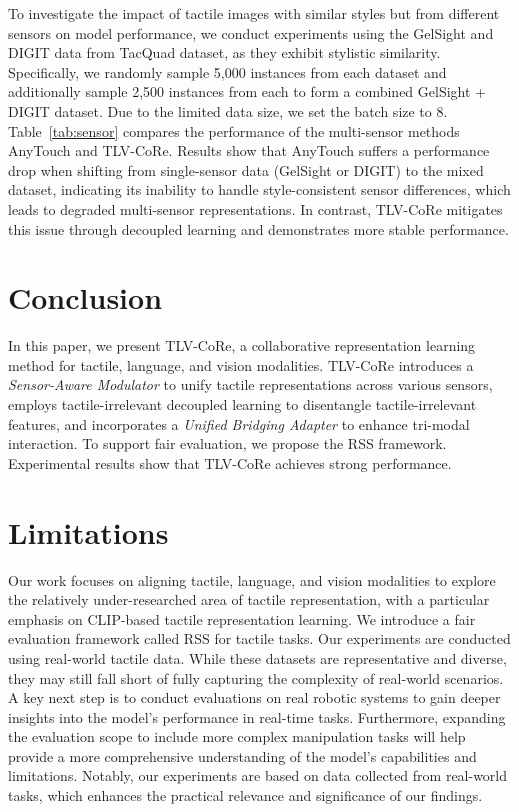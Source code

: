\documentclass[letterpaper]{article} %
\theoremstyle{definition}                %
\theoremstyle{plain}                     %
\theoremstyle{remark}                    %
\begin{document}
To investigate the impact of tactile images with similar styles but from different sensors on model performance, we conduct experiments using the GelSight and DIGIT data from TacQuad dataset, as they exhibit stylistic similarity. Specifically, we randomly sample 5,000 instances from each dataset and additionally sample 2,500 instances from each to form a combined GelSight + DIGIT dataset. Due to the limited data size, we set the batch size to 8. Table~\ref{tab:sensor} compares the performance of the multi-sensor methods AnyTouch and TLV-CoRe. Results show that AnyTouch suffers a performance drop when shifting from single-sensor data (GelSight or DIGIT) to the mixed dataset, indicating its inability to handle style-consistent sensor differences, which leads to degraded multi-sensor representations. In contrast, TLV-CoRe mitigates this issue through decoupled learning and demonstrates more stable performance.





\section{Conclusion}
\label{sec:conclusion}
In this paper, we present TLV-CoRe, a collaborative representation learning method for tactile, language, and vision modalities. TLV-CoRe introduces a \textit{Sensor-Aware Modulator} to unify tactile representations across various sensors, employs tactile-irrelevant decoupled learning to disentangle tactile-irrelevant features, and incorporates a \textit{Unified Bridging Adapter} to enhance tri-modal interaction. To support fair evaluation, we propose the RSS framework. Experimental results show that TLV-CoRe achieves strong performance.

\section{Limitations}
\label{sec:limitation}



Our work focuses on aligning tactile, language, and vision modalities to explore the relatively under-researched area of tactile representation, with a particular emphasis on CLIP-based tactile representation learning. We introduce a fair evaluation framework called RSS for tactile tasks. Our experiments are conducted using real-world tactile data. While these datasets are representative and diverse, they may still fall short of fully capturing the complexity of real-world scenarios. A key next step is to conduct evaluations on real robotic systems to gain deeper insights into the model's performance in real-time tasks. Furthermore, expanding the evaluation scope to include more complex manipulation tasks will help provide a more comprehensive understanding of the model’s capabilities and limitations. Notably, our experiments are based on data collected from real-world tasks, which enhances the practical relevance and significance of our findings.
\end{document}
